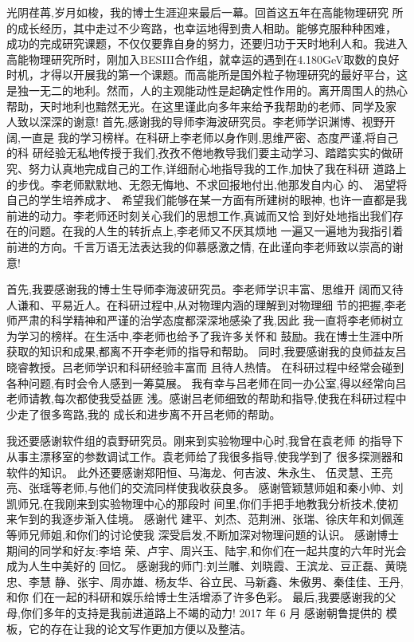 \begin{ack}
光阴荏苒,岁月如梭，我的博士生涯迎来最后一幕。回首这五年在高能物理研究
所的成长经历，其中走过不少弯路，也幸运地得到贵人相助。能够克服种种困难，
成功的完成研究课题，不仅仅要靠自身的努力，还要归功于天时地利人和。我进入
高能物理研究所时，刚加入BESIII合作组，就幸运的遇到在4.180GeV取数的良好
时机，才得以开展我的第一个课题。而高能所是国外粒子物理研究的最好平台，这
是独一无二的地利。然而，人的主观能动性是起确定性作用的。离开周围人的热心
帮助，天时地利也黯然无光。在这里谨此向多年来给予我帮助的老师、同学及家
人致以深深的谢意!
首先,感谢我的导师李海波研究员。李老师学识渊博、视野开阔,一直是
我的学习榜样。在科研上李老师以身作则,思维严密、态度严谨,将自己的科
研经验无私地传授于我们,孜孜不倦地教导我们要主动学习、踏踏实实的做研
究、努力认真地完成自己的工作,详细耐心地指导我的工作,加快了我在科研
道路上的步伐。李老师默默地、无怨无悔地、不求回报地付出,他那发自内心
的、 渴望将自己的学生培养成才、 希望我们能够在某一方面有所建树的眼神,
也许一直都是我前进的动力。李老师还时刻关心我们的思想工作,真诚而又恰
到好处地指出我们存在的问题。在我的人生的转折点上,李老师又不厌其烦地
一遍又一遍地为我指引着前进的方向。千言万语无法表达我的仰慕感激之情,
在此谨向李老师致以崇高的谢意!

首先,我要感谢我的博士生导师李海波研究员。李老师学识丰富、思维开
阔而又待人谦和、平易近人。在科研过程中,从对物理内涵的理解到对物理细
节的把握,李老师严肃的科学精神和严谨的治学态度都深深地感染了我,因此
我一直将李老师树立为学习的榜样。在生活中,李老师也给予了我许多关怀和
鼓励。我在博士生涯中所获取的知识和成果,都离不开李老师的指导和帮助。
同时,我要感谢我的良师益友吕晓睿教授。吕老师学识和科研经验丰富而
且待人热情。 在科研过程中经常会碰到各种问题,有时会令人感到一筹莫展。
我有幸与吕老师在同一办公室,得以经常向吕老师请教,每次都使我受益匪
浅。感谢吕老师细致的帮助和指导,使我在科研过程中少走了很多弯路,我的
成长和进步离不开吕老师的帮助。


我还要感谢软件组的袁野研究员。刚来到实验物理中心时,我曾在袁老师
的指导下从事主漂移室的参数调试工作。袁老师给了我很多指导,使我学到了
很多探测器和软件的知识。 此外还要感谢郑阳恒、马海龙、何吉波、朱永生、
伍灵慧、王亮亮、张瑶等老师,与他们的交流同样使我收获良多。
感谢管颖慧师姐和秦小帅、刘凯师兄,在我刚来到实验物理中心的那段时
间里,你们手把手地教我分析技术,使初来乍到的我逐步渐入佳境。 感谢代
建平、刘杰、范荆洲、张瑞、徐庆年和刘佩莲等师兄师姐,和你们的讨论使我
深受启发,不断加深对物理问题的认识。 感谢博士期间的同学和好友:李培
荣、卢宇、周兴玉、陆宇,和你们在一起共度的六年时光会成为人生中美好的
回忆。
感谢我的师门:刘兰雕、刘晓霞、王滨龙、豆正磊、黄晓忠、李慧
静、张宇、周亦雄、杨友华、谷立民、马新鑫、朱傲男、秦佳佳、王丹,和你
们在一起的科研和娱乐给博士生活增添了许多色彩。
最后,我要感谢我的父母,你们多年的支持是我前进道路上不竭的动力!
2017 年 6 月
感谢朝鲁提供的 \ucasthesis 模板，它的存在让我的论文写作更加方便以及整洁。

\end{ack}
